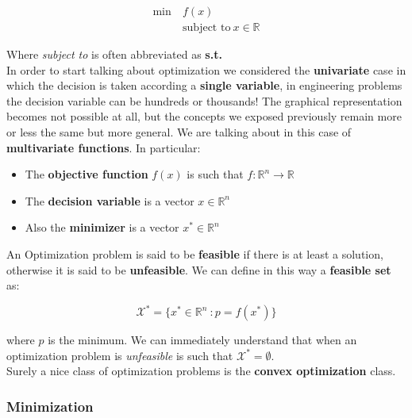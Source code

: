 {\large{
\begin{equation}
    \begin{aligned}
        \min \ &f(x)\\
        &\text{subject to} \ x\in \mathbb{R}
    \end{aligned}
\end{equation}

}}

Where \textit{subject to} is often abbreviated as \textbf{s.t.}\\
In order to start talking about optimization we considered the \textbf{univariate} case in which the decision is taken according a \textbf{single variable}, in engineering problems the decision variable can be hundreds or thousands! The graphical representation becomes not possible at all, but the concepts we exposed previously remain more or less the same but more general. We are talking about in this case of \textbf{multivariate functions}. In particular: 
\begin{itemize}
    \item The \textbf{objective function} $f(x)$ is such that $f:\mathbb{R}^n\to\mathbb{R}$
    \item The \textbf{decision variable} is a vector $x\in\mathbb{R}^n$
    \item Also the \textbf{minimizer} is a vector $x^*\in \mathbb{R}^n$
\end{itemize}
An Optimization problem is said to be \textbf{feasible} if there is at least a solution, otherwise it is said to be \textbf{unfeasible}. We can define in this way a \textbf{feasible set} as:
{\large{

\begin{equation}
    \mathcal{X}^*=\{x^* \in \mathbb{R}^n \ : p=f(x^*) \}
\end{equation}
}}

where $p$ is the minimum. We can immediately understand that when an optimization problem is \textit{unfeasible} is such that $\mathcal{X}^*=\emptyset$. \\
Surely a nice class of optimization problems is the \textbf{convex optimization} class.

{\color{blue} \subsubsection{Minimization}}

